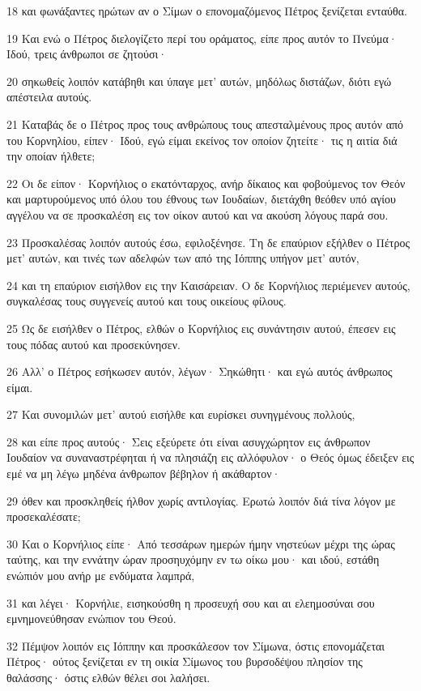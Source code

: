 \par 18 και φωνάξαντες ηρώτων αν ο Σίμων ο επονομαζόμενος Πέτρος ξενίζεται ενταύθα.
\par 19 Και ενώ ο Πέτρος διελογίζετο περί του οράματος, είπε προς αυτόν το Πνεύμα· Ιδού, τρεις άνθρωποι σε ζητούσι·
\par 20 σηκωθείς λοιπόν κατάβηθι και ύπαγε μετ' αυτών, μηδόλως διστάζων, διότι εγώ απέστειλα αυτούς.
\par 21 Καταβάς δε ο Πέτρος προς τους ανθρώπους τους απεσταλμένους προς αυτόν από του Κορνηλίου, είπεν· Ιδού, εγώ είμαι εκείνος τον οποίον ζητείτε· τις η αιτία διά την οποίαν ήλθετε;
\par 22 Οι δε είπον· Κορνήλιος ο εκατόνταρχος, ανήρ δίκαιος και φοβούμενος τον Θεόν και μαρτυρούμενος υπό όλου του έθνους των Ιουδαίων, διετάχθη θεόθεν υπό αγίου αγγέλου να σε προσκαλέση εις τον οίκον αυτού και να ακούση λόγους παρά σου.
\par 23 Προσκαλέσας λοιπόν αυτούς έσω, εφιλοξένησε. Τη δε επαύριον εξήλθεν ο Πέτρος μετ' αυτών, και τινές των αδελφών των από της Ιόππης υπήγον μετ' αυτόν,
\par 24 και τη επαύριον εισήλθον εις την Καισάρειαν. Ο δε Κορνήλιος περιέμενεν αυτούς, συγκαλέσας τους συγγενείς αυτού και τους οικείους φίλους.
\par 25 Ως δε εισήλθεν ο Πέτρος, ελθών ο Κορνήλιος εις συνάντησιν αυτού, έπεσεν εις τους πόδας αυτού και προσεκύνησεν.
\par 26 Αλλ' ο Πέτρος εσήκωσεν αυτόν, λέγων· Σηκώθητι· και εγώ αυτός άνθρωπος είμαι.
\par 27 Και συνομιλών μετ' αυτού εισήλθε και ευρίσκει συνηγμένους πολλούς,
\par 28 και είπε προς αυτούς· Σεις εξεύρετε ότι είναι ασυγχώρητον εις άνθρωπον Ιουδαίον να συναναστρέφηται ή να πλησιάζη εις αλλόφυλον· ο Θεός όμως έδειξεν εις εμέ να μη λέγω μηδένα άνθρωπον βέβηλον ή ακάθαρτον·
\par 29 όθεν και προσκληθείς ήλθον χωρίς αντιλογίας. Ερωτώ λοιπόν διά τίνα λόγον με προσεκαλέσατε;
\par 30 Και ο Κορνήλιος είπε· Από τεσσάρων ημερών ήμην νηστεύων μέχρι της ώρας ταύτης, και την εννάτην ώραν προσηυχόμην εν τω οίκω μου· και ιδού, εστάθη ενώπιόν μου ανήρ με ενδύματα λαμπρά,
\par 31 και λέγει· Κορνήλιε, εισηκούσθη η προσευχή σου και αι ελεημοσύναι σου εμνημονεύθησαν ενώπιον του Θεού.
\par 32 Πέμψον λοιπόν εις Ιόππην και προσκάλεσον τον Σίμωνα, όστις επονομάζεται Πέτρος· ούτος ξενίζεται εν τη οικία Σίμωνος του βυρσοδέψου πλησίον της θαλάσσης· όστις ελθών θέλει σοι λαλήσει.
